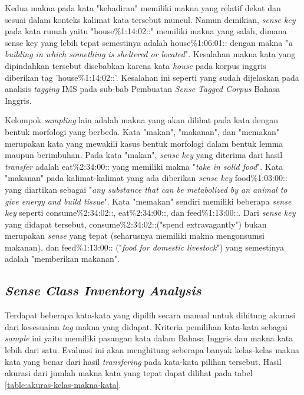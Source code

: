 Kedua makna pada kata "kehadiran" memiliki makna yang relatif dekat dan sesuai dalam konteks kalimat kata tersebut muncul. Namun demikian, \textit{sense key} pada kata rumah yaitu "house\%1:14:02::" memiliki makna yang salah, dimana sense key yang lebih tepat semestinya adalah house\%1:06:01:: dengan makna "\textit{a building in which something is sheltered or located}". Kesalahan makna kata yang dipindahkan tersebut disebabkan karena kata \textit{house} pada korpus inggris diberikan tag 'house\%1:14:02::'. Kesalahan ini seperti yang sudah dijelaskan pada analisis \textit{tagging} IMS pada sub-bab Pembuatan \textit{Sense Tagged Corpus} Bahasa Inggris.


Kelompok \textit{sampling} lain adalah makna yang akan dilihat pada kata dengan bentuk morfologi yang berbeda. Kata "makan", "makanan", dan "memakan" merupakan kata yang mewakili kasus bentuk morfologi dalam bentuk lemma maupun berimbuhan. Pada kata "makan", \textit{sense key} yang diterima dari hasil \textit{transfer} adalah eat\%2:34:00:: yang memiliki makna "\textit{take in solid food}". Kata "makanan" pada kalimat-kalimat yang ada diberikan \textit{sense key} food\%1:03:00:: yang diartikan sebagai "\textit{any substance that can be metabolized by an animal to give energy and build tissue}". Kata "memakan" sendiri memiliki beberapa \textit{sense key} seperti consume\%2:34:02::, eat\%2:34:00::, dan feed\%1:13:00::. Dari \textit{sense key} yang didapat tersebut, consume\%2:34:02::("spend extravagantly") bukan merupakan \textit{sense} yang tepat (seharusnya memiliki makna mengonsumsi makanan), dan feed\%1:13:00:: ("\textit{food for domestic livestock}") yang semestinya adalah "memberikan makanan".

\subsection{\textit{Sense Class Inventory Analysis}}

Terdapat beberapa kata-kata yang dipilih secara manual untuk dihitung akurasi dari kesesuaian \textit{tag} makna yang didapat. Kriteria pemilihan kata-kata sebagai \textit{sample} ini yaitu memiliki pasangan kata  dalam Bahasa Inggris dan makna kata lebih dari satu. Evaluasi ini akan menghitung seberapa banyak kelas-kelas makna kata yang benar dari hasil \textit{transfering} pada kata-kata pilihan tersebut. Hasil akurasi dari jumlah makna kata yang tepat dapat dilihat pada tabel \ref{table:akuras-kelas-makna-kata}.


